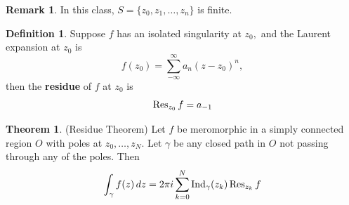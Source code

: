 \documentclass[10pt, oneside]{article}
\newcommand{\Ind}{\text{Ind}}
\theoremstyle{definition}
\newtheorem{thm}{Theorem}
\newtheorem{defn}{Definition}
\newtheorem{rem}{Remark}
\begin{document}
\begin{rem}
    In this class, $S = \{z_0, z_1, \dots, z_n\}$ is finite.
\end{rem}
\begin{defn}
    Suppose $f$ has an isolated singularity at $z_0,$ and the Laurent expansion at $z_0$ is 
    \[f(z_0) = \sum_{-\infty}^\infty a_n (z - z_0)^n,\] then the \textbf{residue} of $f$ at $z_0$ is 
    \[\Res_{z_0}{f} = a_{-1}\]
\end{defn}

\begin{thm}
(Residue Theorem)
Let $f$ be meromorphic in a simply connected region $O$ with poles at $z_0, \dots, z_N.$ Let $\gamma$ be any closed path in $O$ not passing through any of the poles. Then 
\[\int_\gamma f(z)\,dz = 2\pi i \sum_{k=0}^N \Ind_\gamma(z_k) \Res_{z_k}f\]
\end{thm}


\newpage
\end{document}
